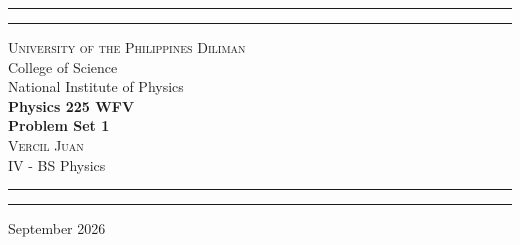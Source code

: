 \begin{titlepage}
    \vspace*{2.5in}
    \hrule
    \vspace{3pt}
    \hrule
    \vspace{0.25in}
    \begin{center}
		{
			\Large 
			\textsc{
				University of the Philippines Diliman
			}
			\\[4pt]
			College of Science
			\\[4pt]
			National Institute of Physics
		}
		\\[0.5cm]
		{
			\Huge
			\textbf{
				Physics 225 WFV
				\\[5pt]
				Problem Set 1
			}
		}
		\\[0.75cm]
		{
			\Large 
			\textsc{
				Vercil Juan
			}
		}\\[5pt] 
		{
			\large 
			IV - BS Physics
		}
    \end{center}
    \vspace{0.25in}
    \hrule
    \vspace{3pt}
    \hrule 
    \vfill
    \begin{center}
    {\large 
		September 2026
	}
    \end{center}
\end{titlepage}
